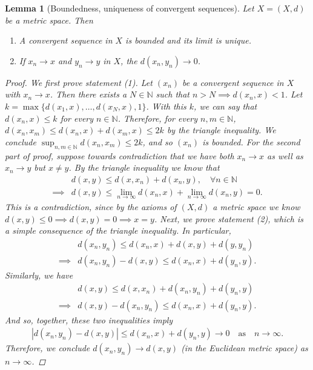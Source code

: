 \documentclass[11pt]{article}
\theoremstyle{mystyle}
\newtheorem{lm}{Lemma}[section]
\begin{document}
\begin{lm}[Boundedness, uniqueness of convergent sequences]\label{uniquelimit}
Let $X = (X, d)$ be a metric space. Then
\begin{enumerate}
    \item A convergent sequence in $X$ is bounded and its limit is unique.
    \item If $x_n \longrightarrow x$ and $y_n \longrightarrow y$ in $X$, the  $d(x_n, y_n) \longrightarrow 0$.
\end{enumerate}
\begin{proof}
We first prove statement (1). Let $(x_n)$ be a convergent sequence in $X$ with $x_n \longrightarrow x$. Then there exists a $N \in \mathbb{N}$ such that $n > N \implies d(x_n, x) < 1$. Let $k = \max \{ d(x_1, x), \ldots, d(x_N, x), 1\}$. With this $k$, we can say that $d(x_n, x) \leq k$ for every $n \in \mathbb{N}$. Therefore, for every $n, m \in \mathbb{N}$, $d(x_n, x_m) \leq d(x_n, x) + d(x_m, x) \leq 2k$ by the triangle inequality. We conclude $\sup_{n, m \in \mathbb{N}} d(x_n, x_m) \leq 2k$, and so $(x_n)$ is bounded.\newline
For the second part of proof, suppose towards contradiction that we have both $x_n \longrightarrow x$ as well as $x_n \longrightarrow y$ but $x \neq y$. By the triangle inequality we know that
\begin{align*}
    &d(x, y) \leq d(x, x_n) + d(x_n, y), \quad \forall n \in \mathbb{N}\\
    \implies& d(x, y) \leq \lim_{n \to \infty} d(x_n, x) + \lim_{n \to \infty} d(x_n, y) = 0.
\end{align*}
This is a contradiction, since by the axioms of $(X, d)$ a metric space we know $d(x,y) \leq 0 \implies d(x, y) = 0 \implies x = y$.\newline
Next, we prove statement (2), which is a simple consequence of the triangle inequality. In particular,
\begin{align*}
    &d(x_n, y_n) \leq d(x_n, x) + d(x, y) + d(y, y_n)\\
    \implies& d(x_n, y_n) - d(x, y) \leq d(x_n, x) + d(y_n, y).
\end{align*}
Similarly, we have
\begin{align*}
    &d(x, y) \leq d(x, x_n) + d(x_n, y_n) + d(y_n, y)\\
    \implies&d(x, y) - d(x_n, y_n) \leq d(x_n, x) + d(y_n,y).
\end{align*}
And so, together, these two inequalities imply
\begin{align*}
    | d(x_n, y_n) - d(x, y) | \leq d(x_n, x) + d(y_n,y) \longrightarrow 0 \quad \text{as} \quad n \longrightarrow \infty.
\end{align*}
Therefore, we conclude $d(x_n, y_n) \longrightarrow d(x, y)$ (in the Euclidean metric space) as $n \longrightarrow \infty$.
\end{proof}

\end{lm}
\end{document}
